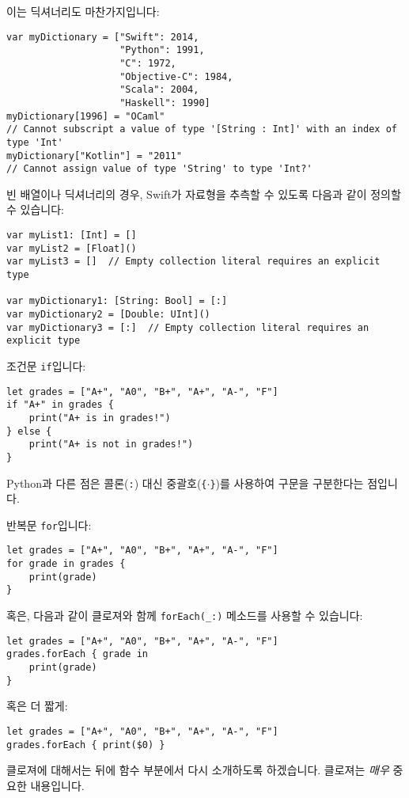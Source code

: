 \documentclass[../main.tex]{subfiles}
\begin{document}
이는 딕셔너리도 마찬가지입니다:
\begin{verbatim}
var myDictionary = ["Swift": 2014,
                    "Python": 1991,
                    "C": 1972,
                    "Objective-C": 1984,
                    "Scala": 2004,
                    "Haskell": 1990]
myDictionary[1996] = "OCaml"
// Cannot subscript a value of type '[String : Int]' with an index of type 'Int'
myDictionary["Kotlin"] = "2011"
// Cannot assign value of type 'String' to type 'Int?'
\end{verbatim}

빈 배열이나 딕셔너리의 경우, Swift가 자료형을 추측할 수 있도록 다음과 같이
정의할 수 있습니다:
\begin{verbatim}
var myList1: [Int] = []
var myList2 = [Float]()
var myList3 = []  // Empty collection literal requires an explicit type

var myDictionary1: [String: Bool] = [:]
var myDictionary2 = [Double: UInt]()
var myDictionary3 = [:]  // Empty collection literal requires an explicit type
\end{verbatim}

조건문 \texttt{if}입니다:
\begin{verbatim}
let grades = ["A+", "A0", "B+", "A+", "A-", "F"]
if "A+" in grades {
    print("A+ is in grades!")
} else {
    print("A+ is not in grades!")
}
\end{verbatim}
Python과 다른 점은 콜론(\texttt{:}) 대신 중괄호(\texttt{\{$\cdot$\}})를
사용하여 구문을 구분한다는 점입니다.

반복문 \texttt{for}입니다:
\begin{verbatim}
let grades = ["A+", "A0", "B+", "A+", "A-", "F"]
for grade in grades {
    print(grade)
}
\end{verbatim}
혹은, 다음과 같이 클로져와 함께 \texttt{forEach(\_:)} 메소드를 사용할 수
있습니다:
\begin{verbatim}
let grades = ["A+", "A0", "B+", "A+", "A-", "F"]
grades.forEach { grade in
    print(grade)
}
\end{verbatim}
혹은 더 짧게:
\begin{verbatim}
let grades = ["A+", "A0", "B+", "A+", "A-", "F"]
grades.forEach { print($0) }
\end{verbatim}
클로져에 대해서는 뒤에 함수 부분에서 다시 소개하도록 하겠습니다.
클로져는 \textit{매우} 중요한 내용입니다.
\end{document}
